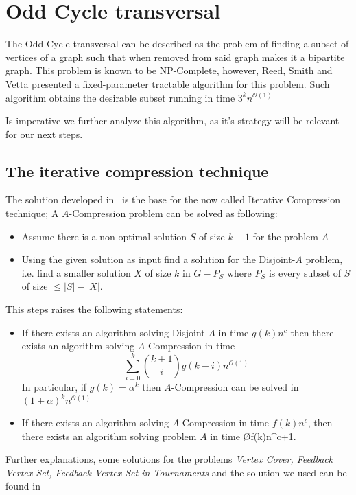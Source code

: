 \section{Odd Cycle transversal}\label{sec:oct}

The Odd Cycle transversal can be described as the problem of finding a subset of vertices of a graph such that when removed from said graph makes it a bipartite graph.
This problem is known to be NP-Complete, however, Reed, Smith and Vetta presented a fixed-parameter tractable algorithm for this problem.
Such algorithm obtains the desirable subset running in time $3^{k}n^{\mathcal{O}(1)}$ \cite{reed-04}

Is imperative we further analyze this algorithm, as it's strategy will be relevant for our next steps.

\subsection{The iterative compression technique}\label{subsec:the-iterative-compression-technique}

The solution developed in~\cite{reed-04} is the base for the now called Iterative Compression technique;
A $A$-Compression problem can be solved as following:

\begin{itemize}
    \item Assume there is a non-optimal solution $S$ of size $k+1$ for the problem $A$
    \item Using the given solution as input find a solution for the Disjoint-$A$ problem, i.e. find a smaller solution $X$ of size $k$ in $G-P_S$ where $P_S$ is every subset of $S$ of size $ \leq |S| - |X|$.
\end{itemize}

This steps raises the following statements:

\begin{tcolorbox}
  \begin{itemize}
    \item If there exists an algorithm solving Disjoint-$A$ in time $g(k)n^c$ then there exists an algorithm solving $A$-Compression in time $$ \sum_{i=0}^k \binom{k+1}{i}g(k-i)n^{\mathcal{O}(1)}$$
          In particular, if $g(k)=\alpha^k$ then $A$-Compression can be solved in $(1+\alpha)^{k}n^{\mathcal{O}(1)}$
    \item If there exists an algorithm solving $A$-Compression in time $f(k)n^c$, then there exists an algorithm solving problem $A$ in time \O{f(k)n^{c+1}}.
  \end{itemize}
\end{tcolorbox}
Further explanations, some solutions for the problems \emph{Vertex Cover, Feedback Vertex Set, Feedback Vertex Set in Tournaments} and the solution we used can be found in~\cite{reed-04,cygan-2015}

